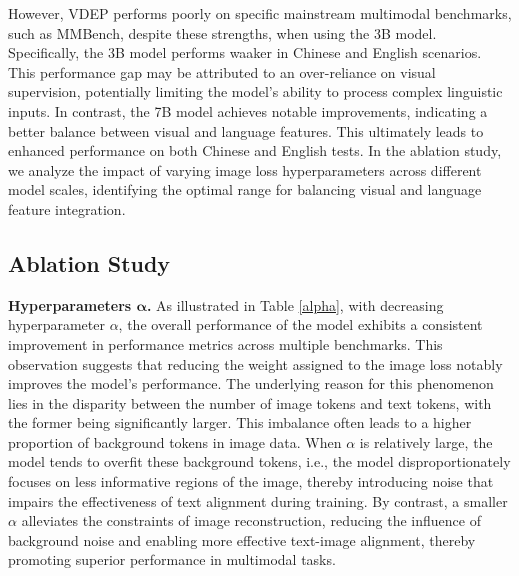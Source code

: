 However, VDEP performs poorly on specific mainstream multimodal benchmarks, such as MMBench, despite these strengths, when using the 3B model. Specifically, the 3B model performs waaker in Chinese and English scenarios. This performance gap may be attributed to an over-reliance on visual supervision, potentially limiting the model's ability to process complex linguistic inputs. In contrast, the 7B model achieves notable improvements, indicating a better balance between visual and language features. This ultimately leads to enhanced performance on both Chinese and English tests. In the ablation study, we analyze the impact of varying image loss hyperparameters across different model scales, identifying the optimal range for balancing visual and language feature integration.


\subsection{Ablation Study}
\textbf{Hyperparameters $\mathbf{\alpha}$.} As illustrated in Table \ref{alpha}, with decreasing hyperparameter $\alpha$, the overall performance of the model exhibits a consistent improvement in performance metrics across multiple benchmarks. This observation suggests that reducing the weight assigned to the image loss notably improves the model's performance. 
The underlying reason for this phenomenon lies in the disparity between the number of image tokens and text tokens, with the former being significantly larger. This imbalance often leads to a higher proportion of background tokens in image data. When $\alpha$ is relatively large, the model tends to overfit these background tokens, i.e., the model disproportionately focuses on less informative regions of the image, thereby introducing noise that impairs the effectiveness of text alignment during training. 
By contrast, a smaller $\alpha$ alleviates the constraints of image reconstruction, reducing the influence of background noise and enabling more effective text-image alignment, thereby promoting superior performance in multimodal tasks.

